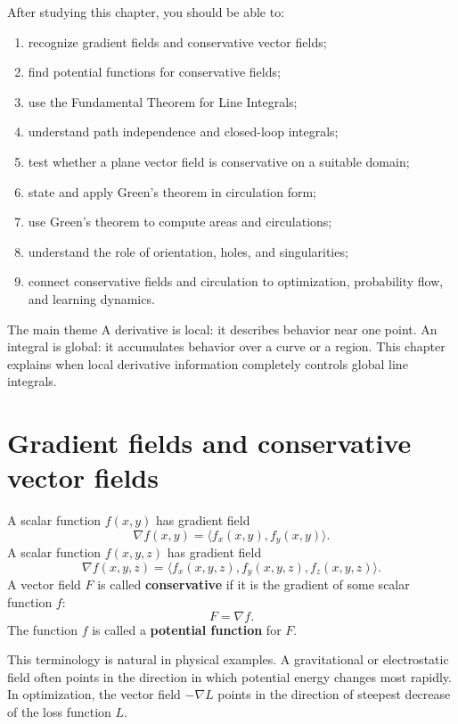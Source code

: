 \documentclass[11pt,oneside]{book}
\newcommand{\grad}{\nabla}
\begin{document}
After studying this chapter, you should be able to:
\begin{enumerate}
  \item recognize gradient fields and conservative vector fields;
  \item find potential functions for conservative fields;
  \item use the Fundamental Theorem for Line Integrals;
  \item understand path independence and closed-loop integrals;
  \item test whether a plane vector field is conservative on a suitable domain;
  \item state and apply Green's theorem in circulation form;
  \item use Green's theorem to compute areas and circulations;
  \item understand the role of orientation, holes, and singularities;
  \item connect conservative fields and circulation to optimization, probability flow, and learning dynamics.
\end{enumerate}

\begin{definitionbox}{The main theme}
A derivative is local: it describes behavior near one point. An integral is global: it accumulates behavior over a curve or a region. This chapter explains when local derivative information completely controls global line integrals.
\end{definitionbox}

\section{Gradient fields and conservative vector fields}

A scalar function $f(x,y)$ has gradient field
\[
\grad f(x,y)=\langle f_x(x,y), f_y(x,y)\rangle.
\]
A scalar function $f(x,y,z)$ has gradient field
\[
\grad f(x,y,z)=\langle f_x(x,y,z), f_y(x,y,z), f_z(x,y,z)\rangle.
\]
A vector field $F$ is called \textbf{conservative} if it is the gradient of some scalar function $f$:
\[
F=\grad f.
\]
The function $f$ is called a \textbf{potential function} for $F$.

This terminology is natural in physical examples. A gravitational or electrostatic field often points in the direction in which potential energy changes most rapidly. In optimization, the vector field $-\grad L$ points in the direction of steepest decrease of the loss function $L$.
\end{document}
